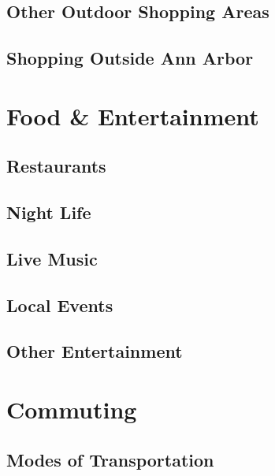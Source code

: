 \documentclass[
]{book}
\begin{document}
\hypertarget{other-outdoor-shopping-areas}{%
\section{Other Outdoor Shopping Areas}\label{other-outdoor-shopping-areas}}

\hypertarget{shopping-outside-ann-arbor}{%
\section{Shopping Outside Ann Arbor}\label{shopping-outside-ann-arbor}}

\hypertarget{food-entertainment}{%
\chapter{Food \& Entertainment}\label{food-entertainment}}

\hypertarget{restaurants}{%
\section{Restaurants}\label{restaurants}}

\hypertarget{night-life}{%
\section{Night Life}\label{night-life}}

\hypertarget{live-music}{%
\section{Live Music}\label{live-music}}

\hypertarget{local-events}{%
\section{Local Events}\label{local-events}}

\hypertarget{other-entertainment}{%
\section{Other Entertainment}\label{other-entertainment}}

\hypertarget{commuting}{%
\chapter{Commuting}\label{commuting}}

\hypertarget{modes-of-transportation}{%
\section{Modes of Transportation}\label{modes-of-transportation}}
\end{document}
